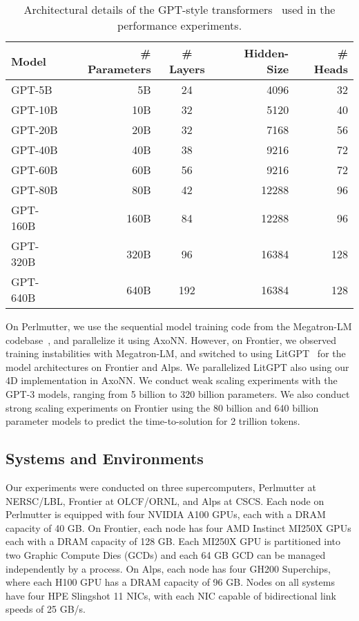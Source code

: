 \begin{table}[h]
  \centering
  \caption{\label{tab:setup-perf-gpt} Architectural details of the GPT-style transformers~\cite{gpt-3} used in the performance experiments.
  }
  \begin{tabular}{lrcrr}
  \toprule
  Model      & \# Parameters & \# Layers  & Hidden-Size &\# Heads  \\ \midrule
  GPT-5B     &   5B & 24      & 4096        & 32   \\
  GPT-10B    &  10B & 32      & 5120        & 40   \\
  GPT-20B    &  20B & 32      & 7168        & 56   \\ 
  GPT-40B    &  40B & 38      & 9216        & 72    \\
  GPT-60B    &  60B & 56      & 9216        & 72    \\
  GPT-80B    &  80B & 42      & 12288       & 96    \\
  GPT-160B   & 160B & 84      & 12288       & 96    \\ 
  GPT-320B   & 320B & 96      & 16384       & 128    \\
  GPT-640B   & 640B & 192      & 16384       & 128    \\ \bottomrule
  \end{tabular}
\end{table}

On Perlmutter, we use the sequential model training code from the Megatron-LM
codebase~\cite{megatronlm-2}, and parallelize it using AxoNN. However, on
Frontier, we observed training instabilities with Megatron-LM, and switched to
using LitGPT~\cite{litgpt-2023} for the model architectures on Frontier and
Alps. We parallelized LitGPT also using our 4D implementation in AxoNN.  We
conduct weak scaling experiments with the GPT-3 models, ranging from 5 billion
to 320 billion parameters.  We also conduct strong scaling experiments on
Frontier using the 80 billion and 640 billion parameter models to predict the
time-to-solution for 2 trillion tokens.

\subsection{Systems and Environments} \label{sec:sys-and-env}

Our experiments were conducted on three supercomputers, Perlmutter at
NERSC/LBL, Frontier at OLCF/ORNL, and Alps at CSCS. Each node on Perlmutter is
equipped with four NVIDIA A100 GPUs, each with a DRAM capacity of 40 GB. On
Frontier, each node has four AMD Instinct MI250X GPUs each with a DRAM capacity
of 128 GB. Each MI250X GPU is partitioned into two Graphic Compute Dies (GCDs)
and each 64 GB GCD can be managed independently by a process. On Alps, each
node has four GH200 Superchips, where each H100 GPU has a DRAM capacity of 96
GB. Nodes on all systems have four HPE Slingshot 11 NICs, with each NIC capable
of bidirectional link speeds of 25 GB/s. 

